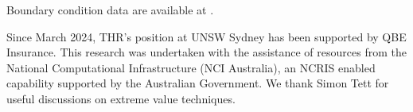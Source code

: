 \documentclass[]{agujournal2019}\usepackage[]{graphicx}\usepackage[]{xcolor}
\begin{document}
Boundary condition data are available at .


\acknowledgments

Since March 2024, THR's position at UNSW Sydney has been supported by QBE Insurance. This research was undertaken with the assistance of resources from the National Computational Infrastructure (NCI Australia), an NCRIS enabled capability supported by the Australian Government. We thank Simon Tett for useful discussions on extreme value techniques.

\nocite{Milbrandt_JAS_2021}
 \nocite{Zhang_JC_2017}
 \nocite{Iacono_JGRA_2008}
 \nocite{Hong_MWR_2006}
 \nocite{Jimenez_MWR_2012}
 \nocite{Niu_JGRA_2011}



\end{document}
